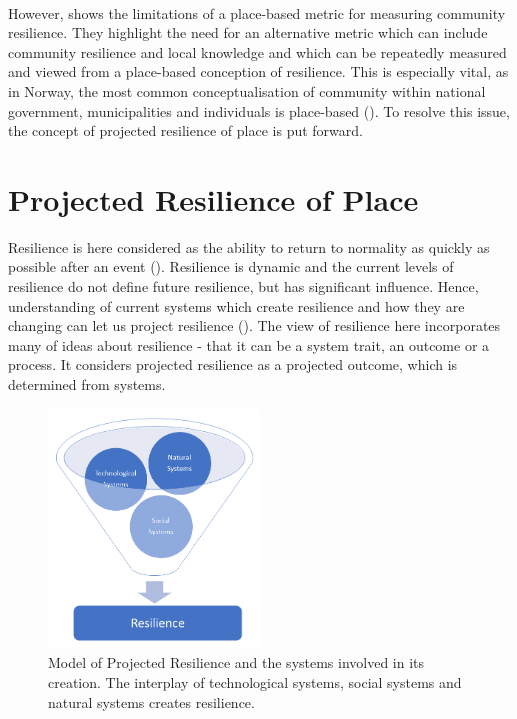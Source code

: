 \paragraph{}

However, \cite{rasanen_conceptualizing_2020} shows the limitations of a place-based metric for measuring community resilience. They highlight the need for an alternative metric which can include community resilience and local knowledge and which can be repeatedly measured and viewed from a place-based conception of resilience. This is especially vital, as in Norway, the most common conceptualisation of community within national government, municipalities and individuals is place-based (\cite{rasanen_conceptualizing_2020}). To resolve this issue, the concept of projected resilience of place is put forward. 




\section{Projected Resilience of Place} 
Resilience is here considered as the ability to return to normality as quickly as possible after an event (\cite{cutter_place-based_2008}). Resilience is dynamic and the current levels of resilience do not define future resilience, but has significant influence. Hence, understanding of current systems which create resilience and how they are changing can let us project resilience (\cite{cutter_community_2020}). The view of resilience here incorporates many of \cite{moser_turbulent_2019} ideas about resilience -  that it can be a system trait, an outcome or a process. It considers projected resilience as a projected outcome, which is determined from systems. 

\begin{figure}[h!]
    \centering
    \includegraphics[width=0.5\textwidth]{fig_theory/resilience model .png}
    \caption{Model of Projected Resilience and the systems involved in its creation. The interplay of technological systems, social systems and natural systems creates resilience. }
    \label{fig:projected_resilience}
\end{figure}

